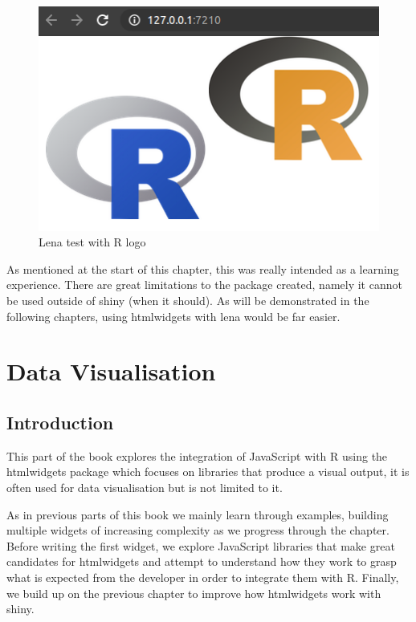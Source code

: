 \documentclass[
]{krantz}
\begin{document}
\begin{figure}
\centering
\includegraphics{images/lena-test.png}
\caption{Lena test with R logo}
\end{figure}

As mentioned at the start of this chapter, this was really intended as a learning experience. There are great limitations to the package created, namely it cannot be used outside of shiny (when it should). As will be demonstrated in the following chapters, using htmlwidgets with lena would be far easier.

\hypertarget{part-data-visualisation}{%
\part{Data Visualisation}\label{part-data-visualisation}}

\hypertarget{introduction-2}{%
\chapter{Introduction}\label{introduction-2}}

This part of the book explores the integration of JavaScript with R using the htmlwidgets package which focuses on libraries that produce a visual output, it is often used for data visualisation but is not limited to it.

As in previous parts of this book we mainly learn through examples, building multiple widgets of increasing complexity as we progress through the chapter. Before writing the first widget, we explore JavaScript libraries that make great candidates for htmlwidgets and attempt to understand how they work to grasp what is expected from the developer in order to integrate them with R. Finally, we build up on the previous chapter to improve how htmlwidgets work with shiny.
\end{document}
